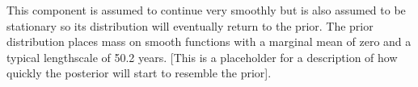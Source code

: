 This component is assumed to continue very smoothly but is also assumed to be stationary so its distribution will eventually return to the prior.
The prior distribution places mass on smooth functions with a marginal mean of zero and a typical lengthscale of 50.2 years.
[This is a placeholder for a description of how quickly the posterior will start to resemble the prior].